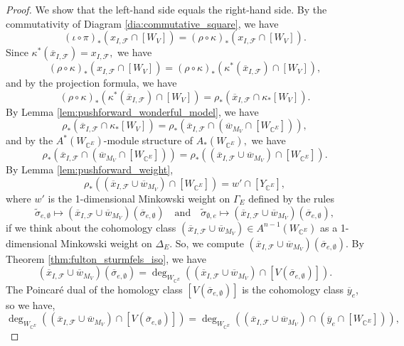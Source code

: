 \documentclass{amsart}
\theoremstyle{plain}
\theoremstyle{definition}
\begin{document}
\begin{proof}
We show that the left-hand side equals the right-hand side. By the commutativity of Diagram \ref{dia:commutative_square}, we have
\[(\iota \circ \pi)_*(x_{I,\mathscr{F}} \cap [W_V]) = (\rho \circ \kappa)_*(x_{I,\mathscr{F}} \cap [W_V]).\]
Since $\kappa^*(\overline{x}_{I,\mathscr{F}}) = x_{I,\mathscr{F}},$ we have
\[(\rho \circ \kappa)_*(x_{I,\mathscr{F}} \cap [W_V]) = (\rho \circ \kappa)_*(\kappa^*(\overline{x}_{I,\mathscr{F}}) \cap [W_V]),\]
and by the projection formula, we have
\[(\rho \circ \kappa)_*(\kappa^*(\overline{x}_{I,\mathscr{F}}) \cap [W_V]) = \rho_*(\overline{x}_{I, \mathscr{F}} \cap \kappa_*[W_V]).\]
By Lemma \ref{lem:pushforward_wonderful_model}, we have
\[\rho_*(\overline{x}_{I, \mathscr{F}} \cap \kappa_*[W_V]) = \rho_*(\overline{x}_{I, \mathscr{F}} \cap (\overline{w}_{M_V} \cap [W_{\mathbb{C}^E}])),\]
and by the $A^*(W_{\mathbb{C}^E})$-module structure of $A_*(W_{\mathbb{C}^E}),$ we have
\[\rho_*(\overline{x}_{I, \mathscr{F}} \cap (\overline{w}_{M_V} \cap [W_{\mathbb{C}^E}])) = \rho_*((\overline{x}_{I, \mathscr{F}} \cup \overline{w}_{M_V}) \cap [W_{\mathbb{C}^E}]).\]
By Lemma \ref{lem:pushforward_weight},
\[\rho_*((\overline{x}_{I, \mathscr{F}} \cup \overline{w}_{M_V}) \cap [W_{\mathbb{C}^E}]) = w' \cap [Y_{\mathbb{C}^E}],\]
where $w'$ is the 1-dimensional Minkowski weight on $\Gamma_E$ defined by the rules
\[\tilde{\sigma}_{e, \emptyset} \mapsto (\overline{x}_{I, \mathscr{F}} \cup \overline{w}_{M_V})(\overline{\sigma}_{e,\emptyset}) \quad \text{and} \quad \tilde{\sigma}_{\emptyset, e} \mapsto (\overline{x}_{I, \mathscr{F}} \cup \overline{w}_{M_V})(\overline{\sigma}_{e,\emptyset}),\]
if we think about the cohomology class $(\overline{x}_{I, \mathscr{F}} \cup \overline{w}_{M_V}) \in A^{n-1}(W_{\mathbb{C}^E})$ as a 1-dimensional Minkowski weight on $\Delta_E.$
So, we compute $(\overline{x}_{I, \mathscr{F}} \cup \overline{w}_{M_V})(\overline{\sigma}_{e,\emptyset}).$ By Theorem \ref{thm:fulton_sturmfels_iso}, we have
\[(\overline{x}_{I, \mathscr{F}} \cup \overline{w}_{M_V})(\overline{\sigma}_{e,\emptyset}) = \deg_{W_{\mathbb{C}^E}}((\overline{x}_{I, \mathscr{F}} \cup \overline{w}_{M_V}) \cap [V(\overline{\sigma}_{e,\emptyset})]).\]
The Poincar\'e dual of the homology class $[V(\overline{\sigma}_{e,\emptyset})]$ is the cohomology class $\overline{y}_e$, so we have,
\[\deg_{W_{\mathbb{C}^E}}((\overline{x}_{I, \mathscr{F}} \cup \overline{w}_{M_V}) \cap [V(\overline{\sigma}_{e,\emptyset})]) = \deg_{W_{\mathbb{C}^E}}((\overline{x}_{I, \mathscr{F}} \cup \overline{w}_{M_V}) \cap (\overline{y}_e \cap [W_{\mathbb{C}^E}])),\]

\end{proof}
\end{document}
